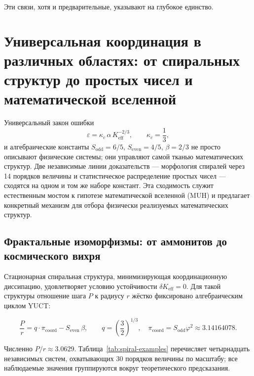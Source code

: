 \documentclass[12pt]{article}
\newcommand{\Keff}{K_{\mathrm{eff}}}
\newcommand{\eps}{\varepsilon}
\newcommand{\kappac}{\kappa_c}
\begin{document}
	Эти связи, хотя и предварительные, указывают на глубокое единство.
	
	\section{Универсальная координация в различных областях: от спиральных структур до простых чисел и математической вселенной}
	\label{sec:universal}
	
	Универсальный закон ошибки
	\begin{equation}
		\eps = \kappac\,\alpha\,\Keff^{-2/3}, \qquad \kappac = \frac{1}{3},
		\label{eq:errorlaw}
	\end{equation}
	и алгебраические константы \(S_{\mathrm{odd}}=6/5\), \(S_{\mathrm{even}}=4/5\), \(\beta=2/3\) не просто описывают физические системы; они управляют самой тканью математических структур. Две независимые линии доказательств — морфология спиралей через 14 порядков величины и статистическое распределение простых чисел — сходятся на одном и том же наборе констант. Эта сходимость служит естественным мостом к гипотезе математической вселенной (MUH) и предлагает конкретный механизм для отбора физически реализуемых математических структур.
	
	\subsection{Фрактальные изоморфизмы: от аммонитов до космического вихря}
	
	Стационарная спиральная структура, минимизирующая координационную диссипацию, удовлетворяет условию устойчивости \(\delta K_{\mathrm{eff}} = 0\). Для такой структуры отношение шага \(P\) к радиусу \(r\) жёстко фиксировано алгебраическим циклом YUCT:
	
	\begin{equation}
		\boxed{ \frac{P}{r} = q \cdot \pi_{\mathrm{coord}} - S_{\mathrm{even}} \, \beta }, \qquad
		q = \left(\frac{3}{2}\right)^{1/3},\quad
		\pi_{\mathrm{coord}} = S_{\mathrm{odd}} \varphi^2 \approx 3.14164078.
		\label{eq:spiral-universal}
	\end{equation}
	
	Численно \(P/r \approx 3.0629\). Таблица~\ref{tab:spiral-examples} перечисляет четырнадцать независимых систем, охватывающих 30 порядков величины по масштабу; все наблюдаемые значения группируются вокруг теоретического предсказания.
	
\end{document}
